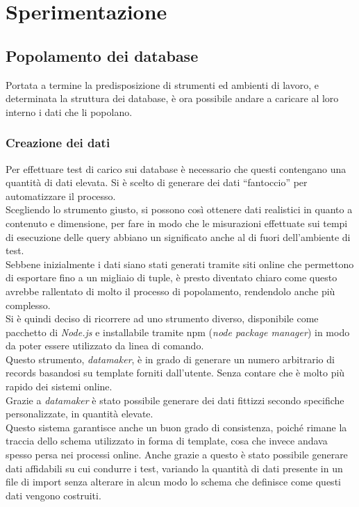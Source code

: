 
\chapter{Sperimentazione}
\label{cap:sperimentazione}
\section{Popolamento dei database}

Portata a termine la predisposizione di strumenti ed ambienti di lavoro, e determinata la struttura dei database, è ora possibile andare a caricare al loro interno i dati che li popolano.\\

\subsection{Creazione dei dati}
Per effettuare test di carico sui database è necessario che questi contengano una quantità di dati elevata. Si è scelto di generare dei dati ``fantoccio'' per automatizzare il processo.\\
Scegliendo lo strumento giusto, si possono così ottenere dati realistici in quanto a contenuto e dimensione, per fare in modo che le misurazioni effettuate sui tempi di esecuzione delle query abbiano un significato anche al di fuori dell'ambiente di test.\\
Sebbene inizialmente i dati siano stati generati tramite siti online che permettono di esportare fino a un migliaio di tuple, è presto diventato chiaro come questo avrebbe rallentato di molto il processo di popolamento, rendendolo anche più complesso.\\

\noindent Si è quindi deciso di ricorrere ad uno strumento diverso, disponibile come pacchetto di \textit{Node.js} e installabile tramite \gls{npm} (\textit{node package manager}) in modo da poter essere utilizzato da linea di comando.\\
Questo strumento, \textit{datamaker}, è in grado di generare un numero arbitrario di records basandosi su template forniti dall'utente. Senza contare che è molto più rapido dei sistemi online.\\
Grazie a \textit{datamaker} è stato possibile generare dei dati fittizzi secondo specifiche personalizzate, in quantità elevate.\\
Questo sistema garantisce anche un buon grado di consistenza, poiché rimane la traccia dello schema utilizzato in forma di template, cosa che invece andava spesso persa nei processi online. Anche grazie a questo è stato possibile generare dati affidabili su cui condurre i test, variando la quantità di dati presente in un file di import senza alterare in alcun modo lo schema che definisce come questi dati vengono costruiti.\\


